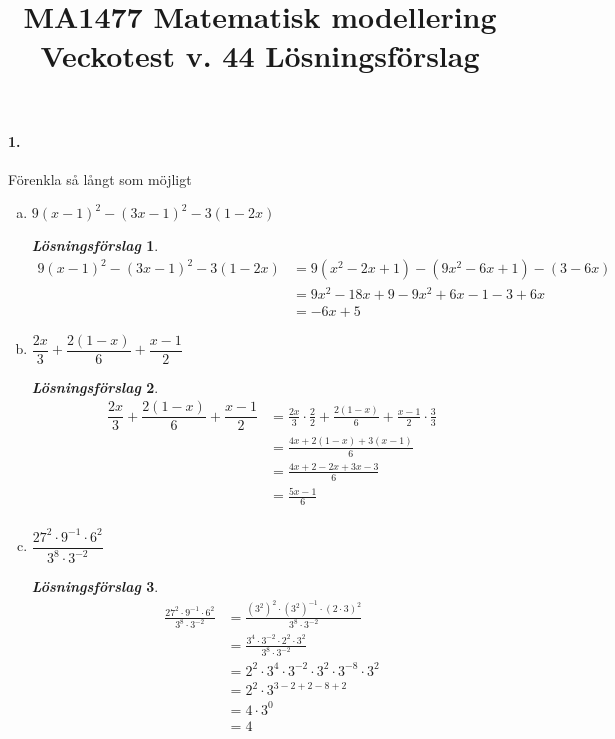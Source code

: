 \documentclass[a4paper]{article}
\title{\bf MA1477 Matematisk modellering \\[10pt]  Veckotest v.
  44 Lösningsförslag}
\newtheorem*{sol}{\normalfont\textit{Lösningsförslag}}
\begin{document}
\maketitle

\paragraph{1.} Förenkla så långt som möjligt
\begin{enumerate}[(a)]
\item $9(x-1)^2 - (3x-1)^2 - 3(1-2x)$
  \begin{sol}
    \begin{align*}
      9(x-1)^2 - (3x-1)^2 - 3(1-2x) 
      &= 9(x^2- 2x +1) - (9x^2 - 6x +1) - (3-6x)\\[1em]
      &= 9x^2 - 18x + 9 - 9x^2 +6x -1 -3 + 6x \\[1em]
      &= -6x +5
    \end{align*}
  \end{sol}
\item $\dfrac{2x}{3} + \dfrac{2(1-x)}{6} + \dfrac{x-1}{2}$
  \begin{sol}
    \begin{align*}
      \dfrac{2x}{3} + \dfrac{2(1-x)}{6} + \dfrac{x-1}{2} 
      &= \frac{2x}{3}\cdot \frac{2}{2} + \frac{2(1-x)}{6} +
        \frac{x-1}{2} \cdot \frac{3}{3} \\[1em]
      &= \frac{4x + 2(1-x)+ 3(x-1)}{6} \\[1em]
      &= \frac{4x + 2-2x +3x-3}{6} \\[1em]
      &= \frac{5x-1}{6} \\[1em]
    \end{align*}
  \end{sol}
\item $\dfrac{27^2\cdot 9^{-1}\cdot 6^2}{3^8\cdot 3^{-2}}$
  \begin{sol}
    \begin{align*}
      \frac{27^2\cdot 9^{-1}\cdot 6^2}{3^8\cdot 3^{-2}}
      &= \frac{(3^2)^2\cdot (3^2)^{-1}\cdot (2\cdot 3)^2}{3^8\cdot
        3^{-2}} \\[1em]
      &= \frac{3^4\cdot 3^{-2}\cdot 2^2 \cdot 3^2}{3^8\cdot 3^{-2}}
      \\[1em]
      &= 2^2\cdot 3^4\cdot 3^{-2}\cdot 3^2 \cdot 3^{-8} \cdot 3^2 \\[1em]
      &= 2^2\cdot 3^{3-2+2-8+2} \\[1em]
      &= 4\cdot 3^0 \\[1em]
      & = 4
    \end{align*}

\end{sol}
\end{enumerate}
\end{document}
